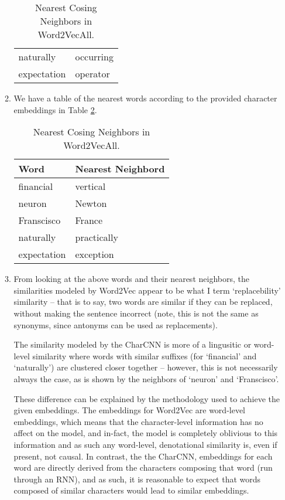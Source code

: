 \documentclass[12pt]{article}
\begin{document}
\begin{enumerate}[label=(\alph*)]
\begin{enumerate}[label=(\roman*)]
\begin{table}[!ht]
\begin{tabular}{|l|l|}
        naturally   & occurring            \\
        expectation  & operator             \\
        \end{tabular}
        \caption{Nearest Cosing Neighbors in Word2VecAll.}
        \label{table:neighbors}
      \end{table}
      \item We have a table of the nearest words according to the provided character embeddings in Table \ref{table:neighbors_character}.
      \begin{table}[!ht]
        \centering
        \begin{tabular}{|l|l|}
        Word      & Nearest Neighbord \\ \hline
        financial  & vertical               \\
        neuron  & Newton              \\
        Franscisco  & France             \\
        naturally   & practically            \\
        expectation  & exception             \\
        \end{tabular}
        \caption{Nearest Cosing Neighbors in Word2VecAll.}
        \label{table:neighbors_character}
      \end{table}
      \item From looking at the above words and their nearest neighbors, the similarities modeled by Word2Vec appear to be what I term `replacebility' similarity -- that is to say, two words are similar if they can be replaced, without making the sentence incorrect (note, this is not the same as synonyms, since antonyms can be used as replacements). 

      The similarity modeled by the CharCNN is more of a lingusitic or word-level similarity where words with similar suffixes (for `financial' and `naturally') are clustered closer together -- however, this is not necessarily always the case, as is shown by the neighbors of `neuron' and `Franscisco'.

      These difference can be explained by the methodology used to achieve the given embeddings. The embeddings for Word2Vec are word-level embeddings, which means that the character-level information has no affect on the model, and in-fact, the model is completely oblivious to this information and as such any word-level, denotational similarity is, even if present, not causal. In contrast, the the CharCNN, embeddings for each word are directly derived from the characters composing that word (run through an RNN), and as such, it is reasonable to expect that words composed of similar characters would lead to similar embeddings.


\end{enumerate}
\end{enumerate}
\end{document}
